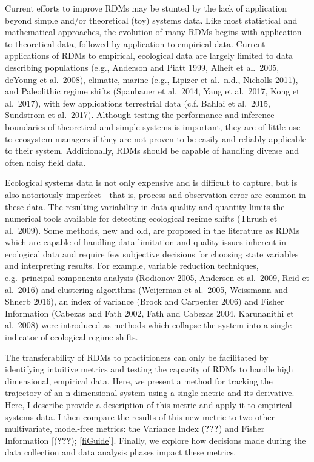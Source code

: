 \documentclass[12pt,twoside,openany]{reedthesis}
\begin{document}
Current efforts to improve RDMs may be stunted by the lack of application beyond simple and/or theoretical (toy) systems data. Like most statistical and mathematical approaches, the evolution of many RDMs begins with application to theoretical data, followed by application to empirical data. Current applications of RDMs to empirical, ecological data are largely limited to data describing populations (e.g., Anderson and Piatt 1999, Alheit et al.~2005, deYoung et al.~2008), climatic, marine (e.g., Lipizer et al.~n.d., Nicholls 2011), and Paleolithic regime shifts (Spanbauer et al.~2014, Yang et al.~2017, Kong et al.~2017), with few applications terrestrial data (c.f. Bahlai et al.~2015, Sundstrom et al.~2017). Although testing the performance and inference boundaries of theoretical and simple systems is important, they are of little use to ecosystem managers if they are not proven to be easily and reliably applicable to their system. Additionally, RDMs should be capable of handling diverse and often noisy field data.

Ecological systems data is not only expensive and is difficult to capture, but is also notoriously imperfect---that is, process and observation error are common in these data. The resulting variability in data quality and quantity limits the numerical tools available for detecting ecological regime shifts (Thrush et al.~2009). Some methods, new and old, are proposed in the literature as RDMs which are capable of handling data limitation and quality issues inherent in ecological data and require few subjective decisions for choosing state variables and interpreting results. For example, variable reduction techniques, e.g.~principal components analysis (Rodionov 2005, Andersen et al.~2009, Reid et al.~2016) and clustering algorithms (Weijerman et al.~2005, Weissmann and Shnerb 2016), an index of variance (Brock and Carpenter 2006) and Fisher Information (Cabezas and Fath 2002, Fath and Cabezas 2004, Karunanithi et al.~2008) were introduced as methods which collapse the system into a single indicator of ecological regime shifts.

The transferability of RDMs to practitioners can only be facilitated by identifying intuitive metrics and testing the capacity of RDMs to handle high dimensional, empirical data. Here, we present a method for tracking the trajectory of an n-dimensional system using a single metric and its derivative. Here, I describe provide a description of this metric and apply it to empirical systems data. I then compare the results of this new metric to two other multivariate, model-free metrics: the Variance Index ({\textbf{???}}) and Fisher Information {[}({\textbf{???}}); \ref{fiGuide}{]}. Finally, we explore how decisions made during the data collection and data analysis phases impact these metrics.
\end{document}
